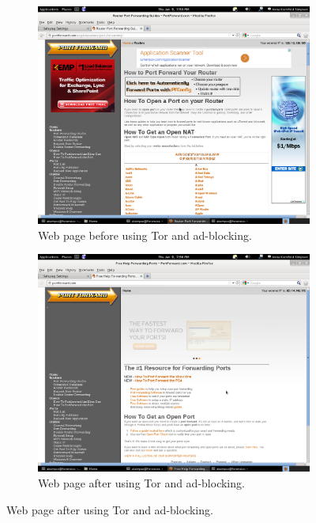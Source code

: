 \begin{figure}[htb]
\centering
\begin{subfigure}[b]{.4\textwidth}
\includegraphics[width=\textwidth]{before}
\caption{Web page before using Tor and ad-blocking.}
\label{fig:before}
\end{subfigure}%
\quad
\begin{subfigure}[b]{.4\textwidth}
\includegraphics[width=\textwidth]{after}
\caption{Web page after using Tor and ad-blocking.}
\label{fig:after}
\end{subfigure}
\end{figure}

